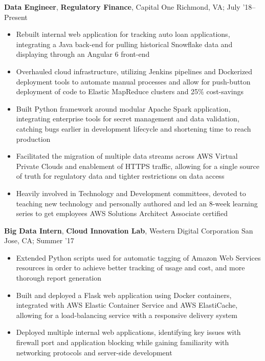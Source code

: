 \documentclass[11pt]{article}
\begin{document}
\textbf{Data Engineer}, \textbf{Regulatory Finance}, Capital One \hfill Richmond, VA; July '18--Present
\begin{itemize}
  \item Rebuilt internal web application for tracking auto loan applications, integrating a Java back-end for pulling historical Snowflake data and displaying through an Angular 6 front-end
	\item Overhauled cloud infrastructure, utilizing Jenkins pipelines and Dockerized deployment tools to automate manual processes and allow for push-button deployment of code to Elastic MapReduce clusters and 25\% cost-savings
	\item Built Python framework around modular Apache Spark application, integrating enterprise tools for secret management and data validation, catching bugs earlier in development lifecycle and shortening time to reach production
  \item Facilitated the migration of multiple data streams across AWS Virtual Private Clouds and enablement of HTTPS traffic, allowing for a single source of truth for regulatory data and tighter restrictions on data access
  \item Heavily involved in Technology and Development committees, devoted to teaching new technology and personally authored and led an 8-week learning series to get employees AWS Solutions Architect Associate certified
\end{itemize}

\textbf{Big Data Intern}, \textbf{Cloud Innovation Lab}, Western Digital Corporation \hfill San Jose, CA; Summer '17
\begin{itemize}
	\item Extended Python scripts used for automatic tagging of Amazon Web Services resources in order to achieve better tracking of usage and cost, and more thorough report generation
	\item Built and deployed a Flask web application using Docker containers, integrated with AWS Elastic Container Service and AWS ElastiCache, allowing for a load-balancing service with a responsive delivery system
  \item Deployed multiple internal web applications, identifying key issues with firewall port and application blocking while gaining familiarity with networking protocols and server-side development
\end{itemize}
\end{document}
